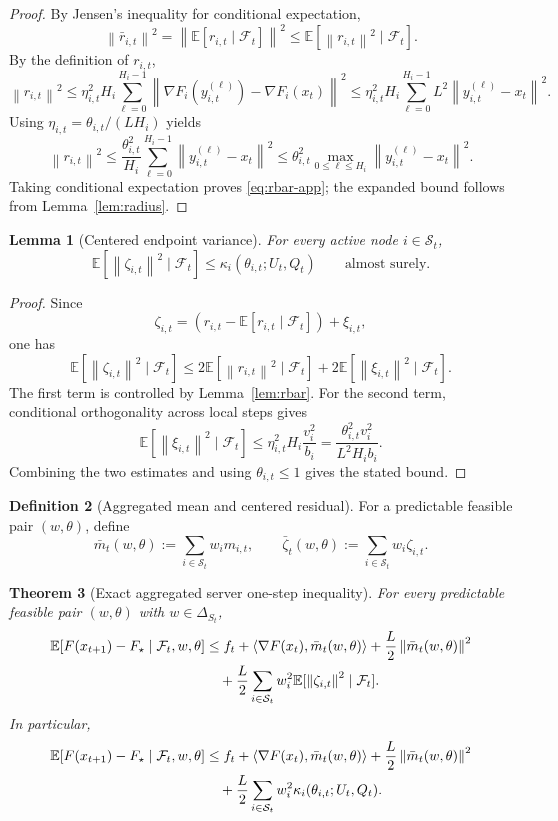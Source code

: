 \documentclass{article}
\newtheorem{theorem}{Theorem}[section]
\newtheorem{lemma}[theorem]{Lemma}
\theoremstyle{definition}
\newtheorem{definition}[theorem]{Definition}
\newcommand{\EE}{\mathbb E}
\newcommand{\cF}{\mathcal F}
\newcommand{\norm}[1]{\left\lVert #1\right\rVert}
\newcommand{\ip}[2]{\left\langle #1,#2\right\rangle}
\begin{document}
\begin{proof}
By Jensen's inequality for conditional expectation,
\[
\norm{\bar r_{i,t}}^2
=
\norm{\EE[r_{i,t}\mid \cF_t]}^2
\le
\EE[\norm{r_{i,t}}^2\mid \cF_t].
\]
By the definition of $r_{i,t}$,
\[
\norm{r_{i,t}}^2
\le
\eta_{i,t}^2 H_i\sum_{\ell=0}^{H_i-1}
\norm{\nabla F_i(y_{i,t}^{(\ell)})-\nabla F_i(x_t)}^2
\le
\eta_{i,t}^2 H_i\sum_{\ell=0}^{H_i-1}L^2\norm{y_{i,t}^{(\ell)}-x_t}^2.
\]
Using $\eta_{i,t}=\theta_{i,t}/(L H_i)$ yields
\[
\norm{r_{i,t}}^2
\le
\frac{\theta_{i,t}^2}{H_i}\sum_{\ell=0}^{H_i-1}\norm{y_{i,t}^{(\ell)}-x_t}^2
\le
\theta_{i,t}^2\max_{0\le \ell\le H_i}\norm{y_{i,t}^{(\ell)}-x_t}^2.
\]
Taking conditional expectation proves \eqref{eq:rbar-app}; the expanded bound
follows from Lemma~\ref{lem:radius}.
\end{proof}

\begin{lemma}[Centered endpoint variance]
\label{lem:kappa}
For every active node $i\in\mathcal S_t$,
\[
\EE[\norm{\zeta_{i,t}}^2\mid \cF_t]
\le
\kappa_i(\theta_{i,t};U_t,Q_t)
\qquad\text{almost surely.}
\]
\end{lemma}

\begin{proof}
Since
\[
\zeta_{i,t}=(r_{i,t}-\EE[r_{i,t}\mid \cF_t])+\xi_{i,t},
\]
one has
\[
\EE[\norm{\zeta_{i,t}}^2\mid \cF_t]
\le
2\EE[\norm{r_{i,t}}^2\mid \cF_t]
+
2\EE[\norm{\xi_{i,t}}^2\mid \cF_t].
\]
The first term is controlled by Lemma~\ref{lem:rbar}. For the second term,
conditional orthogonality across local steps gives
\[
\EE[\norm{\xi_{i,t}}^2\mid \cF_t]
\le
\eta_{i,t}^2 H_i\frac{v_i^2}{b_i}
=
\frac{\theta_{i,t}^2v_i^2}{L^2H_i b_i}.
\]
Combining the two estimates and using $\theta_{i,t}\le 1$ gives the stated
bound.
\end{proof}

\begin{definition}[Aggregated mean and centered residual]
\label{def:agg}
For a predictable feasible pair $(w,\theta)$, define
\[
\bar m_t(w,\theta):=\sum_{i\in\mathcal S_t}w_i m_{i,t},
\qquad
\bar \zeta_t(w,\theta):=\sum_{i\in\mathcal S_t}w_i \zeta_{i,t}.
\]
\end{definition}

\begin{theorem}[Exact aggregated server one-step inequality]
\label{th:agg-server}
For every predictable feasible pair $(w,\theta)$ with $w\in\Delta_{S_t}$,
\begin{align*}
\EE[F(x_{t+1})-F_\star\mid \cF_t,w,\theta]
&\le
f_t
+
\ip{\nabla F(x_t)}{\bar m_t(w,\theta)}
+
\frac{L}{2}\norm{\bar m_t(w,\theta)}^2
\notag\\
&\quad+
\frac{L}{2}\sum_{i\in\mathcal S_t}w_i^2
\EE[\norm{\zeta_{i,t}}^2\mid \cF_t].
\end{align*}
In particular,
\begin{align*}
\EE[F(x_{t+1})-F_\star\mid \cF_t,w,\theta]
&\le
f_t
+
\ip{\nabla F(x_t)}{\bar m_t(w,\theta)}
+
\frac{L}{2}\norm{\bar m_t(w,\theta)}^2
\notag\\
&\quad+
\frac{L}{2}\sum_{i\in\mathcal S_t}w_i^2 \kappa_i(\theta_{i,t};U_t,Q_t).
\end{align*}
\end{theorem}
\end{document}
